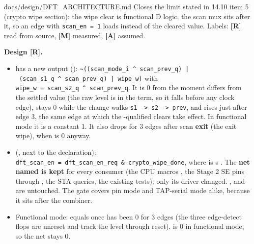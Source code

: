\begin{relocated}{docs/design/DFT_ARCHITECTURE.md}
Closes the limit stated in 14.10 item 5 (crypto wipe section): the wipe
clear is functional D logic, the scan mux sits after it, so an edge with
\texttt{scan\_\allowbreak{}en\ =\allowbreak{}\ 1} loads 
instead of the cleared value. Labels: \textbf{{[}R{]}} read from source,
\textbf{{[}M{]}} measured, \textbf{{[}A{]}} assumed.

\textbf{Design {[}R{]}.}

\begin{itemize}
\tightlist
\item
   has a new output 
  ():
  \texttt{\textasciitilde{}((scan\_\allowbreak{}mode\_\allowbreak{}i\ \textasciicircum{}\ scan\_\allowbreak{}prev\_\allowbreak{}q)\ |\ (scan\_\allowbreak{}s1\_\allowbreak{}q\ \textasciicircum{}\ scan\_\allowbreak{}prev\_\allowbreak{}q)\ |\ wipe\_\allowbreak{}w)}
  with
  \texttt{wipe\_\allowbreak{}w\ =\allowbreak{}\ scan\_\allowbreak{}s2\_\allowbreak{}q\ \textasciicircum{}\ scan\_\allowbreak{}prev\_\allowbreak{}q}.
  It is 0 from the moment  differs from the settled
  value (the raw level is in the term, so it falls before any clock
  edge), stays 0 while the change walks
  \texttt{s1\ -\allowbreak{}>\ s2\ -\allowbreak{}>\ prev}, and rises
  just after edge 3, the same edge at which the -qualified
  clears take effect. In functional mode it is a constant 1. It also
  drops for 3  edges after scan \textbf{exit} (the exit
  wipe), when  is 0 anyway.
\item
   (, next to the
   declaration):
  \texttt{dft\_\allowbreak{}scan\_\allowbreak{}en\ =\allowbreak{}\ dft\_\allowbreak{}scan\_\allowbreak{}en\_\allowbreak{}req\ \&\ crypto\_\allowbreak{}wipe\_\allowbreak{}done},
  where  is \textquotesingle s
  . The \textbf{net named  is kept}
  for every consumer (the CPU macro\textquotesingle s ,
  the Stage 2 SE pins through , the STA queries,
  the existing tests); only its driver changed. ,
   and  are untouched. The gate
  covers pin mode and TAP-serial mode alike, because it sits after the
   combiner.
\item
  Functional mode:  equals  once
   has been 0 for 3  edges (the three
  edge-detect flops are unreset and track the level through reset).
   is 0 in functional mode, so the net stays 0.
\end{itemize}


\end{relocated}
